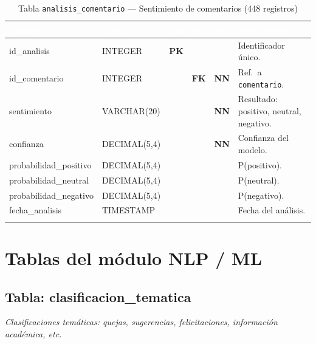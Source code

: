 \documentclass[11pt,a4paper]{article}
\newcommand{\tableheadrow}{\rowcolor{tableheader}}
\newcommand{\tablehead}[1]{\textcolor{white}{\textbf{#1}}}
\newcommand{\pk}{\textcolor{emiblue}{\textbf{PK}}}
\newcommand{\fk}{\textcolor{orange!80!black}{\textbf{FK}}}
\newcommand{\nn}{\textcolor{red!70!black}{\textbf{NN}}}
\begin{document}
\begin{longtable}{p{4.2cm} p{2.8cm} c c c p{4.5cm}}
\toprule
\tableheadrow
\tablehead{Campo} & \tablehead{Tipo} & \tablehead{PK} & \tablehead{FK} & \tablehead{NN} & \tablehead{Descripción} \\
\midrule
\endhead
id\_analisis & INTEGER & \pk & & & Identificador único. \\
\rowcolor{tablerow}
id\_comentario & INTEGER & & \fk & \nn & Ref.\ a \texttt{comentario}. \\
sentimiento & VARCHAR(20) & & & \nn & Resultado: positivo, neutral, negativo. \\
\rowcolor{tablerow}
confianza & DECIMAL(5,4) & & & \nn & Confianza del modelo. \\
probabilidad\_positivo & DECIMAL(5,4) & & & & P(positivo). \\
\rowcolor{tablerow}
probabilidad\_neutral & DECIMAL(5,4) & & & & P(neutral). \\
probabilidad\_negativo & DECIMAL(5,4) & & & & P(negativo). \\
\rowcolor{tablerow}
fecha\_analisis & TIMESTAMP & & & & Fecha del análisis. \\
\bottomrule
\caption{Tabla \texttt{analisis\_comentario} — Sentimiento de comentarios (448 registros)}
\end{longtable}

\section{Tablas del módulo NLP / ML}

\subsection{Tabla: clasificacion\_tematica}
\textit{Clasificaciones temáticas: quejas, sugerencias, felicitaciones, información académica, etc.}
\end{document}
